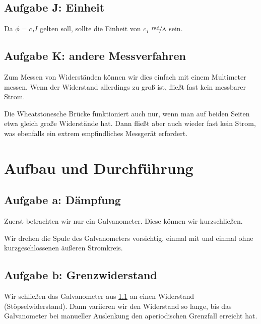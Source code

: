 \documentclass[11pt, ngerman]{article}
\begin{document}
\subsection{Aufgabe J: Einheit}

Da \( \phi = c_I I \) gelten soll, sollte die Einheit von $c_I$
$\unitfrac{rad}{A}$ sein.

\subsection{Aufgabe K: andere Messverfahren}

Zum Messen von Widerständen können wir dies einfach mit einem Multimeter
messen. Wenn der Widerstand allerdings zu groß ist, fließt fast kein messbarer
Strom.

Die Wheatstonesche Brücke funktioniert auch nur, wenn man auf beiden Seiten
etwa gleich große Widerstände hat. Dann fließt aber auch wieder fast kein
Strom, was ebenfalls ein extrem empfindliches Messgerät erfordert.


\section{Aufbau und Durchführung}

\subsection{Aufgabe a: Dämpfung}

\label{Durchführung-a}

Zuerst betrachten wir nur ein Galvanometer. Diese können wir kurzschließen.

Wir drehen die Spule des Galvanometers vorsichtig, einmal mit und einmal ohne
kurzgeschlossenen äußeren Stromkreis.

\subsection{Aufgabe b: Grenzwiderstand}

Wir schließen das Galvanometer aus \ref{Durchführung-a} an einen Widerstand
(Stöpselwiderstand). Dann variieren wir den Widerstand so lange, bis das
Galvanometer bei manueller Auslenkung den aperiodischen Grenzfall erreicht hat.
\end{document}
